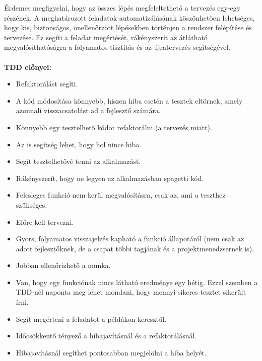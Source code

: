 Érdemes megfigyelni, hogy az összes lépés megfeleltethető a tervezés egy-egy részének. A meghatározott feladatok automatizálásának köszönhetően lehetséges, hogy kis, biztonságos, önellenőrzött lépésekben történjen a rendszer felépítése és tervezése. Ez segíti a feladat megértését, rákényszerít az átlátható megvalósíthatóságra a folyamatos tisztítás és az újratervezés segítségével.\\
\hfill\\
\textbf{TDD előnyei:}

\begin{itemize}
\item Refaktorálást segíti.
\item A kód módosítása könnyebb, hiszen hiba esetén a tesztek eltörnek, amely azonnali visszacsatolást ad a fejlesztő számára.
\item Könnyebb egy tesztelhető kódot refaktorálni (a tervezés miatt).
\item Az is segítség lehet, hogy hol nincs hiba.
\item Segít tesztelhetővé tenni az alkalmazást.
\item Rákényszerít, hogy ne legyen az alkalmazásban spagetti kód.
\item Felesleges funkció nem kerül megvalósításra, csak az, ami a teszthez szükséges.
\item Előre kell tervezni.
\item Gyors, folyamatos visszajelzés kapható a funkció állapotáról (nem csak az adott fejlesztőknek, de a csapat többi tagjának és a projektmenedzsernek is).
\item Jobban ellenőrizhető a munka.
\item Van, hogy egy funkciónak nincs látható eredménye egy hétig. Ezzel szemben a TDD-nél naponta meg lehet mondani, hogy mennyi sikeres tesztet sikerült írni.
\item Segít megérteni a feladatot a példákon keresztül.
\item Időcsökkentő tényező a hibajavításnál és a refaktorálásnál.
\item Hibajavításnál segíthet pontosabban megjelölni a hiba helyét.

\end{itemize}
